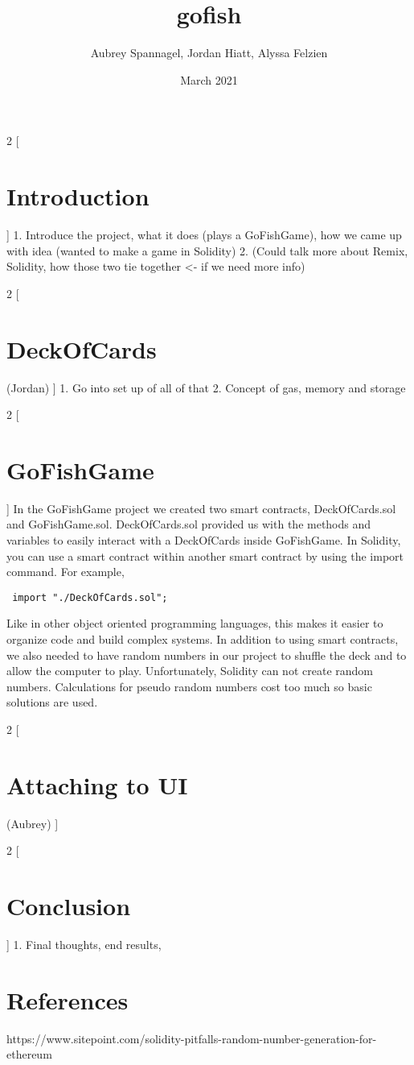 \documentclass{article}
\title{gofish}
\author{Aubrey Spannagel, Jordan Hiatt, Alyssa Felzien }
\date{March 2021}
\begin{document}
\maketitle
\begin{multicols}{2}
[
\section{Introduction}
]
1. Introduce the project, what it does (plays a GoFishGame), how we came up with idea (wanted to make a game in Solidity) 
2. (Could talk more about Remix, Solidity, how those two tie together <- if we need more info)

\end{multicols}
\begin{multicols}{2}
[
\section{DeckOfCards} (Jordan)
]
1. Go into set up of all of that
2. Concept of gas, memory and storage
\end{multicols}

\begin{multicols}{2}
[
\section{GoFishGame}
]
In the GoFishGame project we created two smart contracts, DeckOfCards.sol and GoFishGame.sol. DeckOfCards.sol provided us with the methods and variables to easily interact with a DeckOfCards inside GoFishGame. In Solidity, you can use a smart contract within another smart contract by using the import command. For example, \begin{verbatim} import "./DeckOfCards.sol"; \end{verbatim} Like in other object oriented programming languages, this makes it easier to organize code and build complex systems.
In addition to using smart contracts, we also needed to have random numbers in our project to shuffle the deck and to allow the computer to play. Unfortunately, Solidity can not create random numbers. Calculations for pseudo random numbers cost too much so basic solutions are used.  

\end{multicols}
\begin{multicols}{2} [
\section{Attaching to UI} (Aubrey)
]
\end{multicols}

\begin{multicols}{2} [
\section{Conclusion}
]
1. Final thoughts, end results, 
\end{multicols}


\section{References} 
https://www.sitepoint.com/solidity-pitfalls-random-number-generation-for-ethereum 
\end{document}
